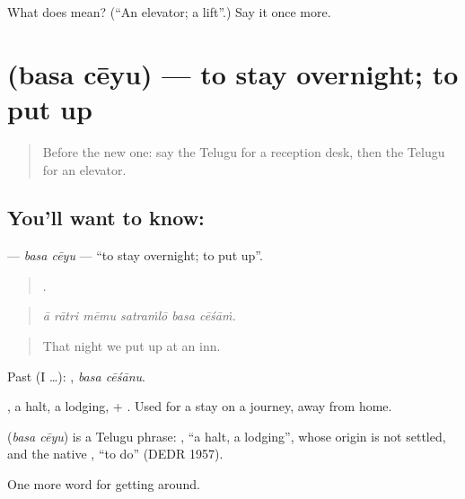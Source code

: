 \begin{tcolorbox}[breakable,colback=teal!4,colframe=teal!35!black,title={Before you move on}]
What does  mean? (\textquotedblleft{}An elevator; a lift\textquotedblright{}.) Say it once more.
\end{tcolorbox}
\section[\texorpdfstring{\te{బస} \te{చేయు} (basa cēyu)}{బస చేయు (basa cēyu)}]{  (basa cēyu) — to stay overnight; to put up}

\label{lesson:TE-C457-basa-ceyu}



\begin{quote}
Before the new one: say the Telugu for a reception desk, then the Telugu for an elevator.
\end{quote}

\subsection*{You'll want to know:  }
\textbf{ } — \emph{basa cēyu} — \textquotedblleft{}to stay overnight; to put up\textquotedblright{}.

\begin{quote}
     .
\end{quote}

\begin{quote}
\emph{ā rātri mēmu satraṁlō basa cēśāṁ.}
\end{quote}

\begin{quote}
That night we put up at an inn.
\end{quote}

Past (I …):  , \emph{basa cēśānu}.

, a halt, a lodging, + . Used for a stay on a journey, away from home.

\begin{cousinweb}
\textbf{ } (\emph{basa cēyu}) is a Telugu phrase: , \textquotedblleft{}a halt, a lodging\textquotedblright{}, whose origin is not settled, and the native , \textquotedblleft{}to do\textquotedblright{} (DEDR 1957).
\end{cousinweb}

\begin{grammarlens}[title={What you've built}]
One more word for getting around.
\end{grammarlens}

